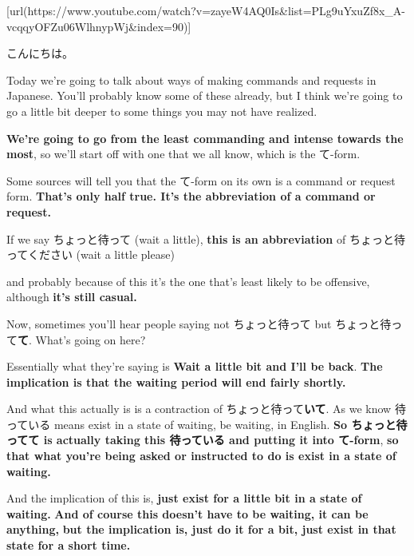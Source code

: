 \startsectionlevel[title={{\bf 83. Three Levels of Command in Japanese: て-form commands, なさい, な-commands, imperative form.}},reference={three-levels-of-command-in-japanese-て-form-commands-なさい-な-commands-imperative-form.}]

[url(https://www.youtube.com/watch?v=zayeW4AQ0Is&list=PLg9uYxuZf8x_A-vcqqyOFZu06WlhnypWj&index=90)]

こんにちは。

Today we're going to talk about ways of making commands and requests in Japanese. You'll probably know some of these already, but I think we're going to go a little bit deeper to some things you may not have realized.

{\bf We're going to go from the least commanding and intense towards the most}, so we'll start off with one that we all know, which is the て-form.

\startsectionlevel[title={The て-form},reference={the-て-form}]

Some sources will tell you that the て-form on its own is a command or request form. {\bf That's only half true. It's the abbreviation of a command or request.}

If we say ちょっと待って (wait a little), {\bf this is an abbreviation} of ちょっと待ってください (wait a little please)

{}

and probably because of this it's the one that's least likely to be offensive, although {\bf it's still casual.}

Now, sometimes you'll hear people saying not ちょっと待って but ちょっと待って{\bf て}. What's going on here?

{}

Essentially what they're saying is {\bf Wait a little bit and I'll be back}. {\bf The implication is that the waiting period will end fairly shortly.}

And what this actually is is a contraction of ちょっと待って{\bf いて}. As we know 待っている means exist in a state of waiting, be waiting, in English. {\bf So ちょっと待ってて is actually taking this 待っている and putting it into て-form}, {\bf so that what you're being asked or instructed to do is exist in a state of waiting.}

And the implication of this is, {\bf just exist for a little bit in a state of waiting.} {\bf And of course this doesn't have to be waiting, it can be anything,} {\bf but the implication is, just do it for a bit, just exist in that state for a short time.}

